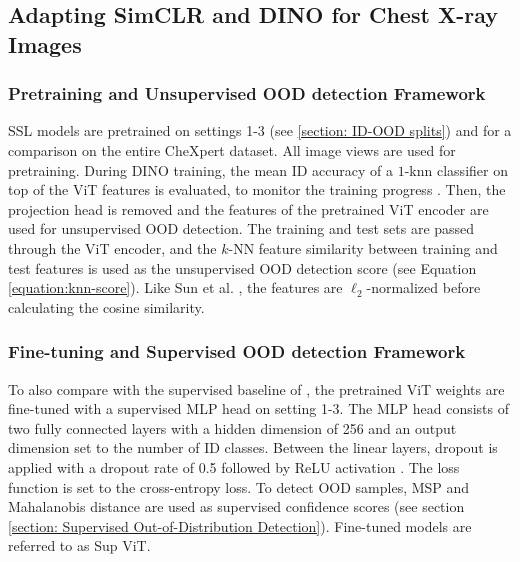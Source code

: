 \subsection{Adapting SimCLR and DINO for Chest X-ray Images}
\label{section: adapted-methods}
\subsubsection{Pretraining and Unsupervised OOD detection Framework}
SSL models are pretrained on settings 1-3 (see \ref{section: ID-OOD splits}) and for a comparison on the entire CheXpert dataset.
All image views are used for pretraining.
During DINO training, the mean ID accuracy of a $1$-knn classifier on top of the ViT features is evaluated, to monitor the training progress \citep{Wu2018,Caron2021}.
Then, the projection head is removed \citep{Caron2021,Chen2020} and the features of the pretrained ViT encoder are used for unsupervised OOD detection.
The training and test sets are passed through the ViT encoder, and the $k$-NN feature similarity between training and test features is used as the unsupervised OOD detection score (see Equation \ref{equation:knn-score}).
Like Sun et al. \citep{Sun2022}, the features are $\ell_2$-normalized before calculating the cosine similarity.
\par
\subsubsection{Fine-tuning and Supervised OOD detection Framework}
To also compare with the supervised baseline of \citep{Berger2021}, the pretrained ViT weights are fine-tuned with a supervised MLP head on setting 1-3.
The MLP head consists of two fully connected layers with a hidden dimension of 256 and an output dimension set to the number of ID classes.
Between the linear layers, dropout is applied with a dropout rate of 0.5 \citep{Srivastava2014} followed by ReLU activation \citep{Agarap2018}.
The loss function is set to the cross-entropy loss. 
To detect OOD samples, MSP and Mahalanobis distance are used as supervised confidence scores (see section \ref{section: Supervised Out-of-Distribution Detection}).
Fine-tuned models are referred to as Sup ViT.
\par
